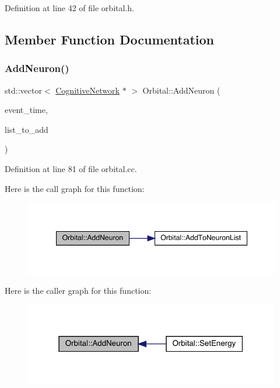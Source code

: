 Definition at line 42 of file orbital.\+h.



\subsection{Member Function Documentation}
\mbox{\label{class_orbital_a57480cdd63dd1bf731864f513767800d}} 
\subsubsection{\texorpdfstring{Add\+Neuron()}{AddNeuron()}}
{\footnotesize\ttfamily std\+::vector$<$ \hyperlink{class_cognitive_network}{Cognitive\+Network} $\ast$ $>$ Orbital\+::\+Add\+Neuron (\begin{DoxyParamCaption}\item[{std\+::chrono\+::time\+\_\+point$<$ \hyperlink{universe_8h_a0ef8d951d1ca5ab3cfaf7ab4c7a6fd80}{Clock} $>$}]{event\+\_\+time,  }\item[{std\+::vector$<$ \hyperlink{class_cognitive_network}{Cognitive\+Network} $\ast$$>$}]{list\+\_\+to\+\_\+add }\end{DoxyParamCaption})}



Definition at line 81 of file orbital.\+cc.

Here is the call graph for this function\+:
\nopagebreak
\begin{figure}[H]
\begin{center}
\leavevmode
\includegraphics[width=347pt]{class_orbital_a57480cdd63dd1bf731864f513767800d_cgraph}
\end{center}
\end{figure}
Here is the caller graph for this function\+:
\nopagebreak
\begin{figure}[H]
\begin{center}
\leavevmode
\includegraphics[width=316pt]{class_orbital_a57480cdd63dd1bf731864f513767800d_icgraph}
\end{center}
\end{figure}
\mbox{\label{class_orbital_a44230cebc40357d186c442bfac2507a4}} 
